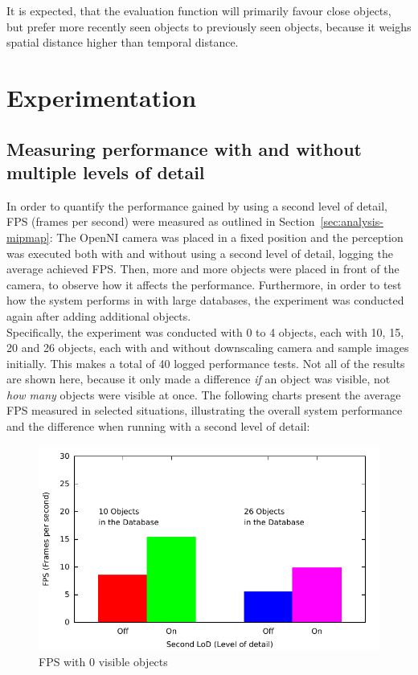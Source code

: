 It is expected, that the evaluation function will primarily favour close objects, but prefer more recently seen objects to previously seen objects, because it weighs spatial distance higher than temporal distance.


\section{Experimentation}

\subsection{Measuring performance with and without multiple levels of detail}
\label{sec:experiment-fps}
In order to quantify the performance gained by using a second level of detail, FPS (frames per second) were measured as outlined in Section~\ref{sec:analysis-mipmap}: The OpenNI camera was placed in a fixed position and the perception was executed both with and without using a second level of detail, logging the average achieved FPS. Then, more and more objects were placed in front of the camera, to observe how it affects the performance. Furthermore, in order to test how the system performs in with large databases, the experiment was conducted again after adding additional objects. \\

Specifically, the experiment was conducted with 0 to 4 objects, each with 10, 15, 20 and 26 objects, each with and without downscaling camera and sample images initially. This makes a total of 40 logged performance tests. Not all of the results are shown here, because it only made a difference \textit{if} an object was visible, not \textit{how many} objects were visible at once. The following charts present the average FPS measured in selected situations, illustrating the overall system performance and the difference when running with a second level of detail:

\begin{figure}[H]
  \includegraphics[width=1.0\textwidth]{images/fps-0-objects.pdf}
  \caption{FPS with 0 visible objects}
\end{figure}

